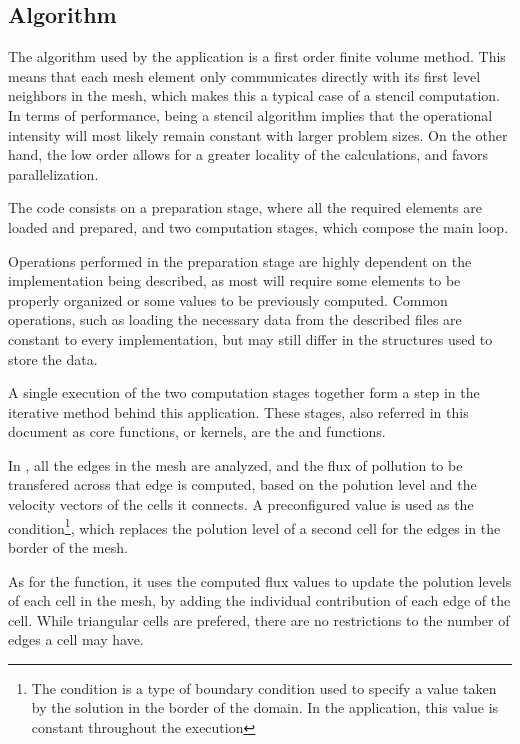 \subsection{Algorithm}

The algorithm used by the \polu application is a first order finite volume method. This means that each mesh element only communicates directly with its first level neighbors in the mesh, which makes this a typical case of a stencil computation. In terms of performance, being a stencil algorithm implies that the operational intensity  will most likely remain constant with larger problem sizes. On the other hand, the low order allows for a greater locality of the calculations, and favors parallelization.

The code consists on a preparation stage, where all the required elements are loaded and prepared, and two computation stages, which compose the main loop.

Operations performed in the preparation stage are highly dependent on the implementation being described, as most will require some elements to be properly organized or some values to be previously computed. Common operations, such as loading the necessary data from the described files are constant to every implementation, but may still differ in the structures used to store the data.

A single execution of the two computation stages together form a step in the iterative method behind this application. These stages, also referred in this document as core functions, or kernels, are the \computeflux and \update functions.

In \computeflux, all the edges in the mesh are analyzed, and the flux of pollution to be transfered across that edge is computed, based on the polution level and the velocity vectors of the cells it connects. A preconfigured value is used as the \dirichlet condition\footnote{The \dirichlet condition is a type of boundary condition used to specify a value taken by the solution in the border of the domain. In the \polu application, this value is constant throughout the execution}, which replaces the polution level of a second cell for the edges in the border of the mesh.

As for the \update function, it uses the computed flux values to update the polution levels of each cell in the mesh, by adding the individual contribution of each edge of the cell. While triangular cells are prefered, there are no restrictions to the number of edges a cell may have.